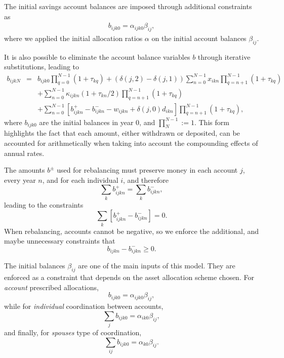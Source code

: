 \documentclass{article}[fleqn,12pt]
\begin{document}
	The initial savings account balances are imposed through additional constraints as
	\begin{eqnarray}
		\label{Eq:InitialBalance}
		b_{ijk0} = \alpha_{ijk0}\beta_{ij},
	\end{eqnarray}
	where we applied the initial allocation ratios $\alpha$ on the initial account balances $\beta_{ij}$.

	It is also possible to eliminate the account balance variables $b$ through iterative
	substitutions, leading to
	\begin{eqnarray}
		\label{Eq:C3c}
		b_{ijkN} &=& b_{ijk0}\prod_{q=0}^{N-1} (1 + \tau_{kq})
		+ (\delta(j, 2) - \delta(j, 1)) \sum_{n=0}^{N-1} 
		x_{ikn} \prod_{q=n+1}^{N-1} (1 + \tau_{kq})
		\nonumber \\
		&&+ \sum_{n=0}^{N-1} \kappa_{ijkn}(1 + \tau_{kn}/2)\prod_{q=n+1}^{N-1} (1 + \tau_{kq})
		\nonumber \\
		&& + \sum_{n=0}^{N-1} [ b^+_{ijkn} - b^-_{ijkn} - w_{ijkn} + \delta(j, 0) d_{ikn}]
		\prod_{q=n+1}^{N-1} (1 + \tau_{kq}),
	\end{eqnarray}
	where $b_{ijk0}$ are the initial balances in year 0, and $\prod_{N}^{N-1} := 1$. This form
	highlights the fact that each amount, either withdrawn or deposited, can be accounted
	for arithmetically when taking into account the compounding effects of annual rates.

	The amounts $b^{\pm}$ used for rebalancing must preserve money in each account $j$, every year $n$,
	and for each individual $i$, and therefore
	\begin{equation}
		\sum_k b^+_{ijkn} = \sum _k b^-_{ijkn},
	\end{equation}
	leading to the constraints
	\begin{equation}
		\label{Eq:NoNewMoney}
		\sum_k [b^+_{ijkn} - b^-_{ijkn}] = 0.
	\end{equation}
	When rebalancing, accounts cannot be negative, so we enforce the additional, and maybe
	unnecessary constraints that
	\begin{equation}
		\label{Eq:EnoughMoney}
		b_{ijkn} - b^-_{ijkn} \geq 0.
	\end{equation}

	The initial balances $\beta_{ij}$ are one of the main inputs of this model. They are
	enforced as a constraint that depends on the asset allocation scheme chosen.
	For {\em account} prescribed allocations,
	\begin{equation}
		\label{Eq:AccountCoord}
		b_{ijk0} =  \alpha_{ijk0}\beta_{ij},
	\end{equation}
	while for {\em individual} coordination between accounts,
	\begin{equation}
		\sum_j b_{ijk0} = \alpha_{ik0}\beta_{ij},
	\end{equation}
	and finally, for {\em spouses} type of coordination,
	\begin{equation}
		\label{Eq:SpouseCoord}
		\sum_{ij} b_{ijk0} = \alpha_{k0}\beta_{ij}.
	\end{equation}
\end{document}
